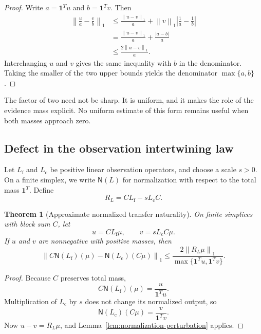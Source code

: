 \documentclass[11pt]{article}
\newtheorem{theorem}{Theorem}[section]
\theoremstyle{definition}
\theoremstyle{remark}
\newcommand{\norm}[1]{\left\lVert #1\right\rVert}
\newcommand{\abs}[1]{\left\lvert #1\right\rvert}
\newcommand{\fine}{\mathrm f}
\newcommand{\coarse}{\mathrm c}
\newcommand{\Nrm}{\mathsf N}
\newcommand{\one}{\mathbf 1}
\begin{document}
\begin{proof}
Write $a=\one^Tu$ and $b=\one^Tv$.  Then
\begin{align*}
\norm{\frac{u}{a}-\frac{v}{b}}_1
&\leq
\frac{\norm{u-v}_1}{a}
+
\norm{v}_1\abs{\frac1a-\frac1b}\\
&=
\frac{\norm{u-v}_1}{a}
+
\frac{\abs{a-b}}{a}\\
&\leq
\frac{2\norm{u-v}_1}{a}.
\end{align*}
Interchanging $u$ and $v$ gives the same inequality with $b$ in the denominator.  Taking the smaller of the two upper bounds yields the denominator $\max\{a,b\}$.
\end{proof}

The factor of two need not be sharp.  It is uniform, and it makes the role of the evidence mass explicit.  No uniform estimate of this form remains useful when both masses approach zero.

\subsection{Defect in the observation intertwining law}
Let $L_{\fine}$ and $L_{\coarse}$ be positive linear observation operators, and choose a scale $s>0$.  On a finite simplex, we write $\Nrm(L)$ for normalization with respect to the total mass $\one^T$.  Define
\begin{equation}\label{eq:observation-linear-defect}
  R_L
  =
  CL_{\fine}-sL_{\coarse}C.
\end{equation}

\begin{theorem}[Approximate normalized transfer naturality]\label{thm:approx-normalized-transfer}
On finite simplices with block sum $C$, let
\[
  u=CL_{\fine}\mu,
  \qquad
  v=sL_{\coarse}C\mu.
\]
If $u$ and $v$ are nonnegative with positive masses, then
\begin{equation}\label{eq:approx-normalized-transfer}
  \boxed{
  \norm{
  C\Nrm(L_{\fine})(\mu)
  -
  \Nrm(L_{\coarse})(C\mu)
  }_1
  \leq
  \frac{2\norm{R_L\mu}_1}
  {\max\{\one^Tu,\one^Tv\}}.}
\end{equation}
\end{theorem}

\begin{proof}
Because $C$ preserves total mass,
\[
  C\Nrm(L_{\fine})(\mu)
  =\frac{u}{\one^Tu}.
\]
Multiplication of $L_{\coarse}$ by $s$ does not change its normalized output, so
\[
  \Nrm(L_{\coarse})(C\mu)
  =\frac{v}{\one^Tv}.
\]
Now $u-v=R_L\mu$, and Lemma~\ref{lem:normalization-perturbation} applies.
\end{proof}
\end{document}
